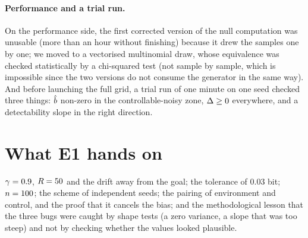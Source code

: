 \documentclass[10pt]{article}
\begin{document}
\paragraph{Performance and a trial run.}
On the performance side, the first corrected version of the null computation was unusable (more than an hour without
finishing) because it drew the samples one by one; we moved to a vectorised multinomial draw, whose equivalence was
checked statistically by a chi-squared test (not sample by sample, which is impossible since the two versions do not
consume the generator in the same way).
And before launching the full grid, a trial run of one minute on one seed checked three things: $\hat{b}$ non-zero in the
controllable-noisy zone, $\Delta \geq 0$ everywhere, and a detectability slope in the right direction. %

\section{What E1 hands on}
\label{sec:legacy}

$\gamma = 0.9$, $R = 50$ and the drift away from the goal; the tolerance of 0.03 bit; %
$n = 100$; the scheme of independent seeds; the pairing of environment and control, and the proof that it
cancels the bias; and the methodological lesson that the three bugs were caught by shape tests (a zero variance, a slope
that was too steep) and not by checking whether the values looked plausible.



\end{document}
